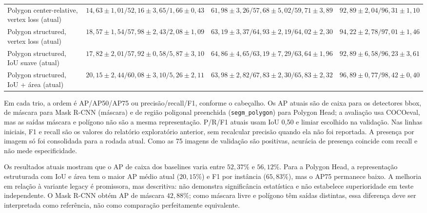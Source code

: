 \documentclass[11pt]{article}
\begin{document}
\begin{longtable}{@{}p{3.5cm}p{4.3cm}p{4.8cm}p{2.5cm}@{}}
Polygon center-relative, vertex loss (atual) & $14,63\pm1,01\allowbreak / 52,16\pm3,65\allowbreak / 1,66\pm0,43$ & $61,98\pm3,26\allowbreak / 57,68\pm5,02\allowbreak / 59,71\pm3,89$ & $92,89\pm2,04\allowbreak / 96,31\pm1,10$ \\
Polygon structured, vertex loss (atual) & $18,57\pm1,54\allowbreak / 57,98\pm2,43\allowbreak / 2,08\pm1,09$ & $63,19\pm3,37\allowbreak / 64,93\pm2,19\allowbreak / 64,02\pm2,30$ & $94,22\pm2,78\allowbreak / 97,01\pm1,46$ \\
Polygon structured, IoU suave (atual) & $17,82\pm2,01\allowbreak / 57,92\pm0,58\allowbreak / 5,87\pm3,10$ & $64,86\pm4,65\allowbreak / 63,19\pm7,29\allowbreak / 63,64\pm1,96$ & $92,89\pm6,58\allowbreak / 96,23\pm3,61$ \\
Polygon structured, IoU + área (atual) & $20,15\pm2,44\allowbreak / 60,08\pm3,10\allowbreak / 5,26\pm2,11$ & $63,98\pm2,82\allowbreak / 67,83\pm2,30\allowbreak / 65,83\pm2,32$ & $96,89\pm0,77\allowbreak / 98,42\pm0,40$ \\
\end{longtable}

\normalsize
{\footnotesize
Em cada trio, a ordem é AP/AP50/AP75 ou precisão/recall/F1, conforme o cabeçalho.
Os AP atuais são de caixa para os detectores bbox, de máscara para Mask R-CNN
(máscara) e de região poligonal preenchida (\texttt{segm\_polygon}) para Polygon
Head; a avaliação usa COCOeval, mas as saídas máscara e polígono não são a mesma
representação. P/R/F1 atuais usam IoU 0,50 e limiar escolhido na validação. Nas
linhas iniciais, F1 e recall são os valores do relatório exploratório anterior, sem
recalcular precisão quando ela não foi reportada. A presença por imagem só foi
consolidada para a rodada atual. Como as 75 imagens de validação são positivas,
acurácia de presença coincide com recall e não mede especificidade.\par}

Os resultados atuais mostram que o AP de caixa dos baselines varia entre
$52,37\%$ e $56,12\%$. Para a Polygon Head, a representação estruturada com IoU e
área tem o maior AP médio atual ($20,15\%$) e F1 por instância ($65,83\%$), mas o
AP75 permanece baixo. A melhoria em relação à variante legacy é promissora, mas
descritiva: não demonstra significância estatística e não estabelece superioridade
em teste independente. O Mask R-CNN obtém AP de máscara $42,88\%$; como máscara
livre e polígono têm saídas distintas, essa diferença deve ser interpretada como
referência, não como comparação perfeitamente equivalente.
\end{document}
